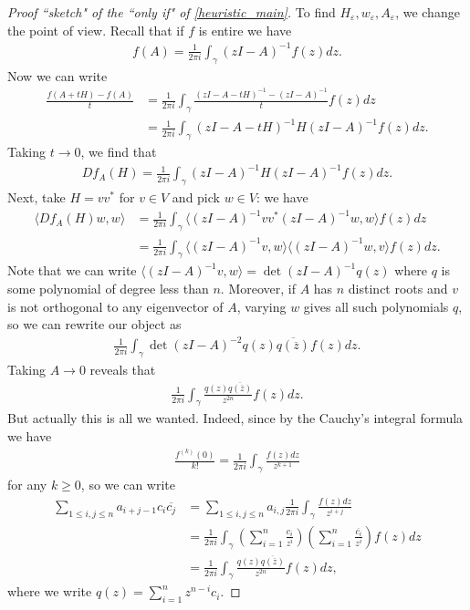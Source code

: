 \begin{proof}[Proof ``sketch" of the ``only if" of \ref{heuristic_main}]
	To find $H_{\varepsilon}, w_{\varepsilon}, A_{\varepsilon}$, we change the point of view. Recall that if $f$ is entire we have
	\begin{align*}
		f(A) = \frac{1}{2 \pi i}\int_{\gamma} (z I - A)^{-1} f(z) dz.
	\end{align*}
	Now we can write
	\begin{align*}
		\frac{f(A + t H) - f(A)}{t} &= \frac{1}{2 \pi i}\int_{\gamma} \frac{(z I - A - t H)^{-1} - (z I - A)^{-1}}{t} f(z) dz \\
		&= \frac{1}{2 \pi i}\int_{\gamma} (z I - A - t H)^{-1} H (z I - A)^{-1} f(z) dz.
	\end{align*}
	Taking $t \to 0$, we find that
	\begin{align*}
		D f_{A}(H) = \frac{1}{2 \pi i}\int_{\gamma} (z I - A)^{-1} H (z I - A)^{-1} f(z) dz.
	\end{align*}
	Next, take $H = v v^{*}$ for $v \in V$ and pick $w \in V$: we have
	\begin{align*}
		\langle D f_{A}(H) w, w \rangle &= \frac{1}{2 \pi i}\int_{\gamma} \langle (z I - A)^{-1} v v^{*} (z I - A)^{-1} w, w \rangle f(z) dz \\
		&= \frac{1}{2 \pi i}\int_{\gamma} \langle (z I - A)^{-1} v, w \rangle \langle (z I - A)^{-1} w, v \rangle f(z) dz.
	\end{align*}
	Note that we can write $\langle (z I - A)^{-1} v, w \rangle = \det(z I - A)^{-1} q(z)$ where $q$ is some polynomial of degree less than $n$. Moreover, if $A$ has $n$ distinct roots and $v$ is not orthogonal to any eigenvector of $A$, varying $w$ gives all such polynomials $q$, so we can rewrite our object as
	\begin{align*}
		\frac{1}{2 \pi i}\int_{\gamma} \det(z I - A)^{-2} q(z) \overline{q(\overline{z})} f(z) dz.
	\end{align*}
	Taking $A \to 0$ reveals that
	\begin{align*}
		\frac{1}{2 \pi i}\int_{\gamma} \frac{q(z) \overline{q(\overline{z})}}{z^{2 n}} f(z) dz.
	\end{align*}
	But actually this is all we wanted. Indeed, since by the Cauchy's integral formula we have
	\begin{align*}
		\frac{f^{(k)}(0)}{k!} = \frac{1}{2 \pi i} \int_{\gamma} \frac{f(z) d z}{z^{k + 1}}
	\end{align*}
	for any $k \geq 0$, so we can write
	\begin{align*}
		\sum_{1 \leq i, j \leq n} a_{i + j - 1} c_{i} \overline{c_{j}} &= \sum_{1 \leq i, j \leq n} a_{i, j} \frac{1}{2 \pi i} \int_{\gamma} \frac{f(z) d z}{z^{i + j}} \\
		&= \frac{1}{2 \pi i} \int_{\gamma} \left(\sum_{i = 1}^{n} \frac{c_{i}}{z^{i}} \right) \left(\sum_{i = 1}^{n} \frac{\overline{c_{i}}}{z^{i}} \right)f(z) dz \\
		&= \frac{1}{2 \pi i} \int_{\gamma}  \frac{q(z) \overline{q(\overline{z})}}{z^{2 n}} f(z) dz,
	\end{align*}
	where we write $q(z) = \sum_{i = 1}^{n} z^{n - i} c_{i}$.
\end{proof}

